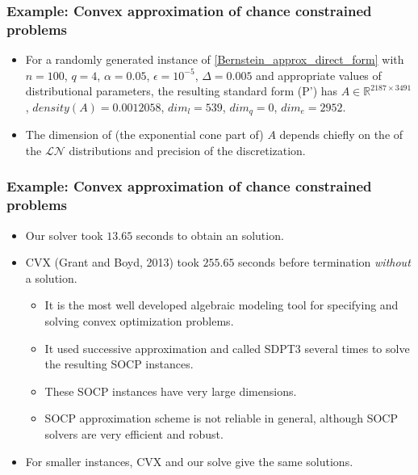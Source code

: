 \documentclass{beamer}
\begin{document}
\begin{frame}
	\frametitle{Example: Convex approximation of chance constrained problems}
	\begin{itemize}
		\item For a randomly generated instance of \eqref{Bernstein_approx_direct_form} with $n=100$, $q=4$, $\alpha=0.05$, $\epsilon=10^{-5}$, $\Delta=0.005$ and appropriate values of distributional parameters, the resulting standard form (P') has $A \in \mathbb{R}^{2187\times 3491}$, $density(A) = 0.0012058$,
		$dim_l = 539$, $dim_q = 0$, $dim_e = 2952$.
		\item The dimension of (the exponential cone part of) $A$ depends chiefly on the  of the $\mathcal{LN}$ distributions and precision of the discretization.
	\end{itemize}
\end{frame}

\begin{frame}
	\frametitle{Example: Convex approximation of chance constrained problems}
	\begin{itemize}
		\item Our solver took $13.65$ seconds to obtain an  solution.
		\item CVX (Grant and Boyd, 2013) took $255.65$ seconds before termination \textit{without} a solution.
		\begin{itemize}
			\item It is the most well developed algebraic modeling tool for specifying and solving convex optimization problems.
			\item It used successive approximation and called SDPT3 several times to solve the resulting SOCP instances. 
			\item These SOCP instances have very large dimensions.
			\item SOCP approximation scheme is not reliable in general, although SOCP solvers are very efficient and robust.
		\end{itemize}
		\item For smaller instances, CVX and our solve give the same solutions.
	\end{itemize}
\end{frame}
\end{document}
